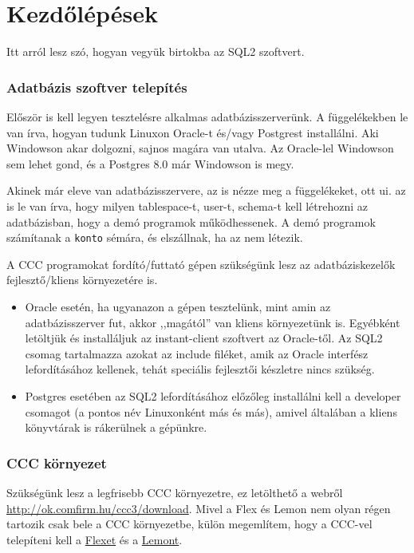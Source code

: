 
\section{Kezdőlépések}

Itt arról lesz szó,  hogyan vegyük birtokba az SQL2 szoftvert.

\subsubsection*{Adatbázis szoftver telepítés}

Először is kell legyen tesztelésre alkalmas adatbázisszerverünk.
A függelékekben le van írva, hogyan tudunk Linuxon Oracle-t
és/vagy Postgrest installálni. Aki Windowson akar dolgozni, sajnos
magára van utalva. Az Oracle-lel Windowson sem lehet gond,
és a Postgres 8.0 már Windowson is megy. 

Akinek már eleve van adatbázisszervere, az is nézze meg
a függelékeket, ott ui. az is le van írva, hogy milyen
tablespace-t, user-t, schema-t kell létrehozni az adatbázisban,
hogy a demó programok működhessenek. A demó programok
számítanak a \verb!konto! sémára, és elszállnak, ha az nem létezik.

A CCC programokat fordító/futtató gépen szükségünk lesz 
az adatbáziskezelők fejlesztő/kliens környezetére is.

\begin{itemize}
\item 
    Oracle esetén, ha ugyanazon a gépen tesztelünk, mint amin
    az adatbázisszerver  fut, akkor ,,magától'' van kliens
    környezetünk is. Egyébként letöltjük és installáljuk az 
    instant-client  szoftvert az Oracle-től. Az SQL2 csomag tartalmazza
    azokat az include filéket, amik az Oracle interfész lefordításához 
    kellenek, tehát speciális fejlesztői készletre nincs szükség.
\item    
    Postgres esetében az SQL2 lefordításához előzőleg installálni
    kell a developer csomagot (a pontos név Linuxonként más és más),
    amivel általában a kliens könyvtárak is rákerülnek a gépünkre.
\end{itemize}

\subsubsection*{CCC környezet}

Szükségünk lesz a legfrisebb CCC környezetre, ez letölthető a webről
\href{http://ok.comfirm.hu/ccc3/download}{http://ok.comfirm.hu/ccc3/download}.
Mivel a Flex és Lemon nem olyan régen tartozik csak bele a CCC környezetbe,
külön  megemlítem, hogy a CCC-vel telepíteni kell 
a \href{http://ok.comfirm.hu/ccc3/download}{Flexet}
és a \href{http://ok.comfirm.hu/ccc3/download}{Lemont}.

